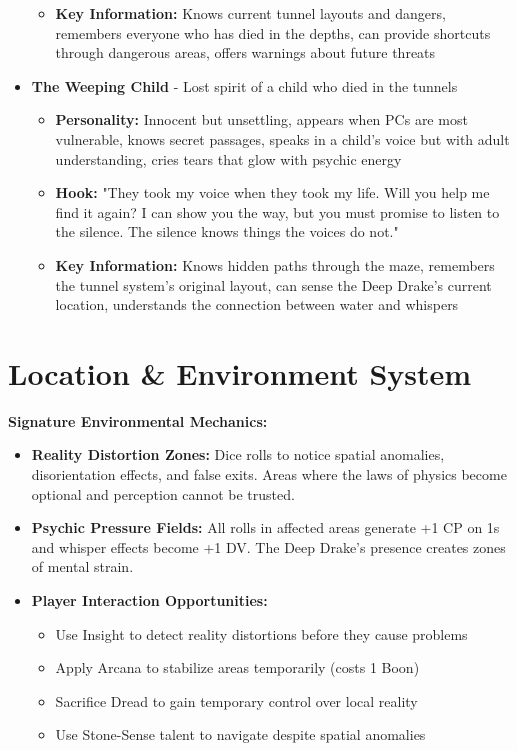 \documentclass[11pt]{article}
\begin{document}
\begin{itemize}
\begin{itemize}
  \item \textbf{Key Information:} Knows current tunnel layouts and dangers, remembers everyone who has died in the depths, can provide shortcuts through dangerous areas, offers warnings about future threats
  \end{itemize}
\item \textbf{The Weeping Child} - Lost spirit of a child who died in the tunnels
  \begin{itemize}
  \item \textbf{Personality:} Innocent but unsettling, appears when PCs are most vulnerable, knows secret passages, speaks in a child's voice but with adult understanding, cries tears that glow with psychic energy
  \item \textbf{Hook:} "They took my voice when they took my life. Will you help me find it again? I can show you the way, but you must promise to listen to the silence. The silence knows things the voices do not."
  \item \textbf{Key Information:} Knows hidden paths through the maze, remembers the tunnel system's original layout, can sense the Deep Drake's current location, understands the connection between water and whispers
  \end{itemize}
\end{itemize}

\section{Location \& Environment System}

\textbf{Signature Environmental Mechanics:}
\begin{itemize}
\item \textbf{Reality Distortion Zones:} Dice rolls to notice spatial anomalies, disorientation effects, and false exits. Areas where the laws of physics become optional and perception cannot be trusted.
\item \textbf{Psychic Pressure Fields:} All rolls in affected areas generate +1 CP on 1s and whisper effects become +1 DV. The Deep Drake's presence creates zones of mental strain.
\item \textbf{Player Interaction Opportunities:}
  \begin{itemize}
  \item Use Insight to detect reality distortions before they cause problems
  \item Apply Arcana to stabilize areas temporarily (costs 1 Boon)
  \item Sacrifice Dread to gain temporary control over local reality
  \item Use Stone-Sense talent to navigate despite spatial anomalies
  \end{itemize}
\end{itemize}
\end{document}
